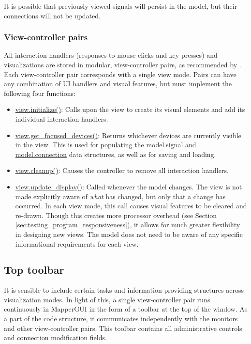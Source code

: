 It is possible that previously viewed signals will persist in the model, but their connections will not be updated.

		\subsubsection{View-controller pairs}

All interaction handlers (responses to mouse clicks and key presses) and visualizations are stored in modular, view-controller pairs, as recommended by . Each view-controller pair corresponds with a single view mode. Pairs can have any combination of UI handlers and visual features, but must implement the following four functions:

\begin{itemize}
	\item \url{view.initialize()}: Calls upon the view to create its visual elements and add its individual interaction handlers.
	\item \url{view.get_focused_devices()}: Returns whichever devices are currently visible in the view. This is used for populating the \url{model.signal} and \url{model.connection} data structures, as well as for saving and loading.
	\item \url{view.cleanup()}: Causes the controller to remove all interaction handlers.
	\item \url{view.update_display()}: Called whenever the model changes. The view is not made explicitly aware of \emph{what} has changed, but only that a change has occurred. In each view mode, this call causes visual features to be cleared and re-drawn. Though this creates more processor overhead (see Section \ref{sec:testing_program_responsiveness}), it allows for much greater flexibility in designing new views. The model does not need to be aware of any specific informational requirements for each view.
\end{itemize}


	\subsection{Top toolbar} %
	\label{sec:top_toolbar}

It is sensible to include certain tasks and information providing structures across visualization modes. In light of this, a single view-controller pair runs continuously in MapperGUI in the form of a toolbar at the top of the window. As a part of the code structure, it communicates independently with the monitors and other view-controller pairs. This toolbar contains all administrative controls and connection modification fields. 


